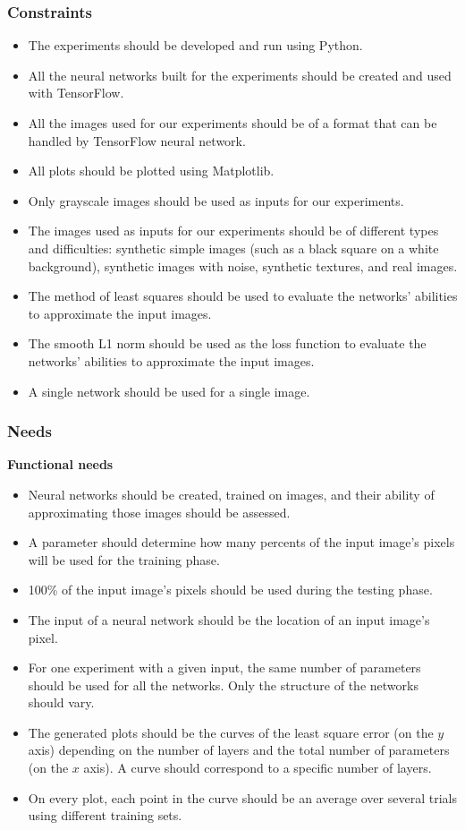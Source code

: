 \documentclass[a4paper]{article}
\begin{document}
\subsubsection{Constraints}
\begin{itemize}
\item The experiments should be developed and run using Python.
\item All the neural networks built for the experiments should be created and used with TensorFlow.
\item All the images used for our experiments should be of a format that can be handled by TensorFlow neural network. 
\item All plots should be plotted using Matplotlib.
\item Only grayscale images should be used as inputs for our experiments.
\item The images used as inputs for our experiments should be of different types and difficulties: synthetic simple images (such as a black square on a white background), synthetic images with noise, synthetic textures, and real images.
\item The method of least squares should be used to evaluate the networks' abilities to approximate the input images.
\item The smooth L1 norm should be used as the loss function to evaluate the networks' abilities to approximate the input images.
\item A single network should be used for a single image.
\end{itemize}

\subsubsection{Needs}
\noindent\textbf{Functional needs}
\begin{itemize}
\item Neural networks should be created, trained on images, and their ability of approximating those images should be assessed. 
\item A parameter should determine how many percents of the input image's pixels will be used for the training phase.
\item 100\% of the input image's pixels should be used during the testing phase.
\item The input of a neural network should be the location of an input image's pixel.
\item For one experiment with a given input, the same number of parameters should be used for all the networks. Only the structure of the networks should vary.
\item The generated plots should be the curves of the least square error (on the $y$ axis) depending on the number of layers and the total number of parameters (on the $x$ axis). A curve should correspond to a specific number of layers.
\item On every plot, each point in the curve should be an average over several trials using different training sets.

\end{itemize}
\end{document}
